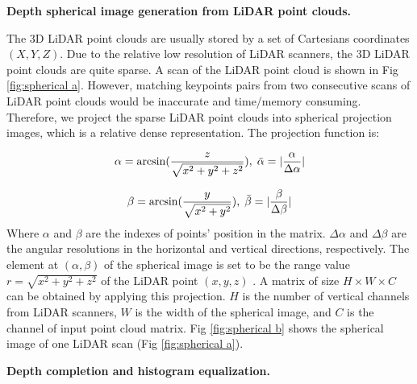 \documentclass[sigconf]{acmart}
\newcommand{\bfsection}[1]{\vspace*{0.1cm}\noindent\textbf{#1.}}
\begin{document}
\bfsection{Depth spherical image generation from LiDAR point clouds}

The 3D LiDAR point clouds are usually stored by a set of Cartesians
coordinates $(X, Y, Z)$. Due to the relative low resolution of LiDAR scanners, the 3D LiDAR point clouds are quite sparse. A scan of the LiDAR point cloud is shown in Fig \ref{fig:spherical a}. However, matching keypoints pairs from two consecutive scans of LiDAR point clouds would be inaccurate and time/memory consuming. Therefore, we project the sparse LiDAR point clouds into spherical projection images, which is a relative dense representation. The projection function is: 

\begin{align}
\small
    \alpha = \arcsin(\frac{z}{\sqrt{x^2 + y^2 +z^2}}), \; 
    \Bar{\alpha} = | \frac{\alpha}{	\Delta\alpha} |
\end{align}

\begin{align}
\small
    \beta = \arcsin(\frac{y}{\sqrt{x^2 + y^2}}), \;
    \Bar{\beta} = | \frac{\beta}{	\Delta\beta} |
\end{align}
Where $\alpha$ and $\beta$ are the indexes of points' position in the matrix. $\Delta\alpha$ and $\Delta\beta$ are the angular resolutions in the horizontal and vertical directions, respectively. The element at $(\alpha, \beta)$ of the spherical image is set to be the range value $r = \sqrt{x^2 + y^2 +z^2} $ of the LiDAR point $(x, y, z)$ \cite{LO-Net}. A matrix of size $H \times W \times C$ can be obtained by applying this projection. $H$ is the number of vertical channels from LiDAR scanners, $W$ is the width of the spherical image, and $C$ is the channel of input point cloud matrix. Fig \ref{fig:spherical b} shows the spherical image of one LiDAR scan (Fig \ref{fig:spherical a}). 


\bfsection{Depth completion and histogram equalization}
\end{document}
